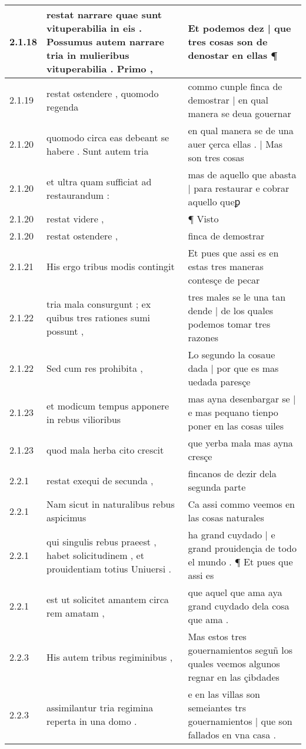 \begin{tabular}{|p{1cm}|p{6.5cm}|p{6.5cm}|}
2.1.18 & restat narrare quae sunt vituperabilia in eis . Possumus autem narrare tria in mulieribus vituperabilia . Primo , & Et podemos dez | que tres cosas son de denostar en ellas ¶ \\\hline
2.1.19 & restat ostendere , quomodo regenda & commo cunple finca de demostrar | en qual manera se deua gouernar \\\hline
2.1.20 & quomodo circa eas debeant se habere . Sunt autem tria & en qual manera se de una auer çerca ellas . | Mas son tres cosas \\\hline
2.1.20 & et ultra quam sufficiat ad restaurandum : & mas de aquello que abasta | para restaurar e cobrar aquello queꝑ \\\hline
2.1.20 & restat videre , & ¶ Visto \\\hline
2.1.20 & restat ostendere , & finca de demostrar \\\hline
2.1.21 & His ergo tribus modis contingit & Et pues que assi es en estas tres maneras contesçe de pecar \\\hline
2.1.22 & tria mala consurgunt ; ex quibus tres rationes sumi possunt , & tres males se le una tan dende | de los quales podemos tomar tres razones \\\hline
2.1.22 & Sed cum res prohibita , & Lo segundo la cosaue dada | por que es mas uedada paresçe \\\hline
2.1.23 & et modicum tempus apponere in rebus vilioribus & mas ayna desenbargar se | e mas pequano tienpo poner en las cosas uiles \\\hline
2.1.23 & quod mala herba cito crescit & que yerba mala mas ayna cresçe \\\hline
2.2.1 & restat exequi de secunda , & fincanos de dezir dela segunda parte \\\hline
2.2.1 & Nam sicut in naturalibus rebus aspicimus & Ca assi commo veemos en las cosas naturales \\\hline
2.2.1 & qui singulis rebus praeest , habet solicitudinem , et prouidentiam totius Uniuersi . & ha grand cuydado | e grand prouidençia de todo el mundo . ¶ Et pues que assi es \\\hline
2.2.1 & est ut solicitet amantem circa rem amatam , & que aquel que ama aya grand cuydado dela cosa que ama . \\\hline
2.2.3 & His autem tribus regiminibus , & Mas estos tres gouernamientos seguñ los quales veemos algunos regnar en las çibdades \\\hline
2.2.3 & assimilantur tria regimina reperta in una domo . & e en las villas son semeiantes trs gouernamientos | que son fallados en vna casa . \\\hline

\end{tabular}
